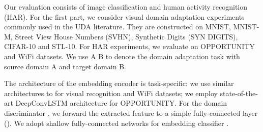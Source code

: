 Our evaluation consists of image classification and human activity recognition (HAR). For the first part, we consider visual domain adaptation experiments commonly used in the UDA literature. They are constructed on MNIST, MNIST-M, Street View House Numbers (SVHN), Synthetic Digits (SYN DIGITS), CIFAR-10 and STL-10. For HAR experiments, we evaluate on OPPORTUNITY \cite{ordonez2016deep} and WiFi \cite{yousefi2017survey} datasets. We use A  B to denote the domain adaptation task with source domain A and target domain B. 


The architecture of the embedding encoder  is task-specific: we use similar architectures to \cite{shu2018dirt} for visual recognition and WiFi datasets; we employ state-of-the-art DeepConvLSTM architecture \cite{ordonez2016deep} for OPPORTUNITY. For the domain discriminator , we forward the extracted feature to a simple fully-connected layer (). We adopt shallow fully-connected networks for embedding classifier .




\begin{table}[t]
\centering
{}
\caption{Test set accuracy () on visual UDA benchmarks.}
\label{tab.visual.domain.experiments}
\end{table}
























